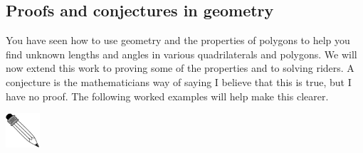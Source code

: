             \subsection{ Proofs and conjectures in geometry}
            \nopagebreak
            \label{m39352*id0723}You have seen how to use geometry and the properties of polygons to help you find unknown lengths and angles in various quadrilaterals and polygons. We will now extend this work to proving some of the properties and to solving riders. A conjecture is the mathematicians way of saying I believe that this is true, but I have no proof. The following worked examples will help make this clearer. 
\par 
\label{m39352*probfhsst!!!underscore!!!id072}\vspace{.5cm} 
      \noindent
      \hspace*{-30pt}\includegraphics[width=0.5in]{col11306.imgs/pspencil2.png}   

